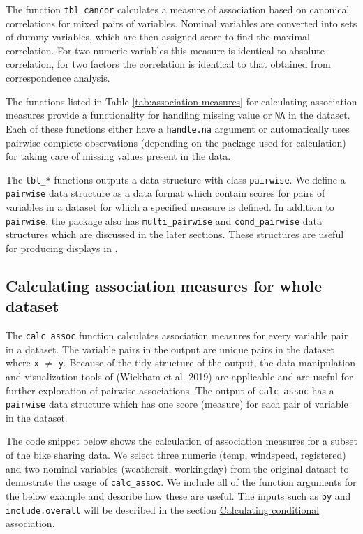The function \texttt{tbl\_cancor} calculates a measure of association based on canonical correlations for mixed pairs of variables. Nominal variables are converted into sets of dummy variables, which are then assigned score to find the maximal correlation. For two numeric variables this measure is identical to absolute correlation, for two factors the correlation is identical to that obtained from correspondence analysis.

The functions listed in Table \ref{tab:association-measures} for calculating association measures provide a functionality for handling missing value or \texttt{NA} in the dataset. Each of these functions either have a \texttt{handle.na} argument or automatically uses pairwise complete observations (depending on the package used for calculation) for taking care of missing values present in the data.

The \texttt{tbl\_*} functions outputs a data structure with class \texttt{pairwise}. We define a \texttt{pairwise} data structure as a data format which contain scores for pairs of variables in a dataset for which a specified measure is defined. In addition to \texttt{pairwise}, the package also has \texttt{multi\_pairwise} and \texttt{cond\_pairwise} data structures which are discussed in the later sections. These structures are useful for producing displays in .

\hypertarget{calculating-association-measures-for-whole-dataset}{%
\subsection{Calculating association measures for whole dataset}\label{calculating-association-measures-for-whole-dataset}}

The \texttt{calc\_assoc} function calculates association measures for every variable pair in a dataset. The variable pairs in the output are unique pairs in the dataset where \texttt{x} \(\neq\) \texttt{y}. Because of the tidy structure of the output, the data manipulation and visualization tools of  (Wickham et al. 2019) are applicable and are useful for further exploration of pairwise associations. The output of \texttt{calc\_assoc} has a \texttt{pairwise} data structure which has one score (measure) for each pair of variable in the dataset.

The code snippet below shows the calculation of association measures for a subset of the bike sharing data. We select three numeric (temp, windspeed, registered) and two nominal variables (weathersit, workingday) from the original dataset to demostrate the usage of \texttt{calc\_assoc}. We include all of the function arguments for the below example and describe how these are useful. The inputs such as \texttt{by} and \texttt{include.overall} will be described in the section \protect\hyperlink{calculating-conditional-association}{Calculating conditional association}.

